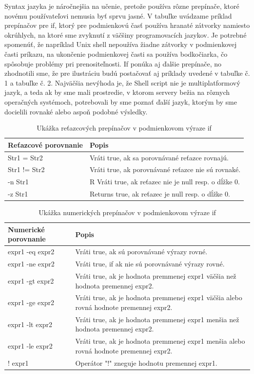 Syntax jazyka je náročnejšia na učenie, pretože používa rôzne prepínače, ktoré novému používateľovi nemusia byť sprvu jasné. 
V tabuľke uvádzame príklad prepínačov pre if, ktorý pre podmienkovú časť používa hranaté zátvorky namiesto okrúhlych, na ktoré sme zvyknutí z väčšiny programovacích jazykov. Je potrebné spomenúť, že napríklad Unix shell nepoužíva žiadne zátvorky v podmienkovej časti príkazu, na ukončenie podmienkovej časti sa používa bodkočiarka, čo spôsobuje problémy pri prenositeľnosti. If ponúka aj ďalšie prepínače, no zhodnotili sme, že pre ilustráciu budú postačovať aj príklady uvedené v tabuľke č. 1 a tabuľke č. 2.
Najväčšia nevýhoda je, že Shell script nie je multiplatformový jazyk, a teda ak by sme mali prostredie, v ktorom servery bežia na rôznych operačných systémoch, potrebovali by sme poznať ďalší jazyk, ktorým by sme docielili rovnaké alebo aspoň podobné výsledky.
\newline
\begin{table}[h!]
	\centering
	\begin{tabular}{|p{4cm}|p{13cm}|}
		\hline
		Reťazcové porovnanie & Popis \\
		\hline
		Str1 = Str2	& Vráti true, ak sa porovnávané reťazce rovnajú. \\ 
		\hline
		Str1 != Str2 &	Vráti true, ak porovnávané reťazce nie sú rovnaké.\\ 
		\hline
		-n Str1	 &R Vráti true, ak reťazec nie je null resp. o dĺžke 0.\\ 
		\hline
		-z Str1	& Returns true, ak reťazec je null resp. o dĺžke 0.\\
		\hline
	\end{tabular}
	\caption{Ukážka reťazcových prepínačov v podmienkovom výraze if \cite{shellprep}}
	\label{table:1}
	
\end{table}
\begin{table}[h!]
	\centering
	\begin{tabular}{|p{4cm}|p{13cm}|}
		\hline
		Numerické porovnanie	& Popis \\
		\hline
		expr1 -eq expr2	& Vráti true, ak sú porovnávané výrazy rovné. \\
		\hline
		expr1 -ne expr2	& Vráti true, if ak nie sú porovnávané výrazy rovné. \\
		\hline
		expr1 -gt expr2	& Vráti true, ak je hodnota premmenej expr1 väčšia než hodnota premennej expr2. \\
		\hline
		expr1 -ge expr2	& Vráti true, ak je hodnota premmenej expr1 väčšia alebo rovná hodnote premennej expr2. \\
		\hline
		expr1 -lt expr2	& Vráti true, ak je hodnota premmenej expr1 menšia než hodnota premennej  expr2. \\
		\hline
		expr1 -le expr2	& Vráti true, ak je hodnota premmenej expr1 menšia alebo rovná hodnote premennej expr2. \\
		\hline
		! expr1	& Operátor "!" zneguje hodnotu premennej expr1. \\
		\hline
	\end{tabular}
	\caption{Ukážka numerických prepínačov v podmienkovom výraze if \cite{shellprep}}
	\label{table:1}
	
\end{table}
